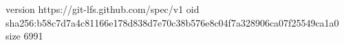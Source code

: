 version https://git-lfs.github.com/spec/v1
oid sha256:b58c7d7a4c81166e178d838d7e70c38b576e8c04f7a328906ca07f25549ca1a0
size 6991
